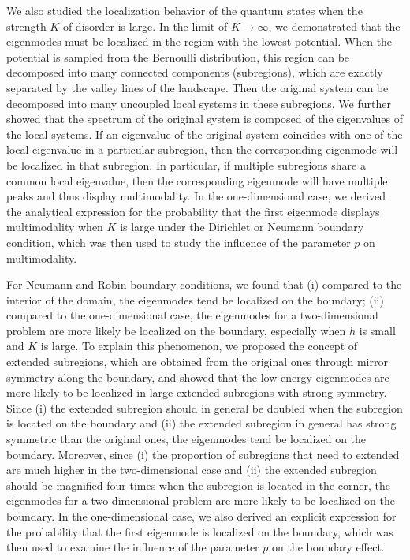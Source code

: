 \documentclass[a4paper,11pt]{article}
\begin{document}
We also studied the localization behavior of the quantum states when the strength $K$ of disorder is large. In the limit of $K\rightarrow\infty$, we demonstrated that the eigenmodes must be localized in the region with the lowest potential. When the potential is sampled from the Bernoulli distribution, this region can be decomposed into many connected components (subregions), which are exactly separated by the valley lines of the landscape. Then the original system can be decomposed into many uncoupled local systems in these subregions. We further showed that the spectrum of the original system is composed of the eigenvalues of the local systems. If an eigenvalue of the original system coincides with one of the local eigenvalue in a particular subregion, then the corresponding eigenmode will be localized in that subregion. In particular, if multiple subregions share a common local eigenvalue, then the corresponding eigenmode will have multiple peaks and thus display multimodality. In the one-dimensional case, we derived the analytical expression for the probability that the first eigenmode displays multimodality when $K$ is large under the Dirichlet or Neumann boundary condition, which was then used to study the influence of the parameter $p$ on multimodality.

For Neumann and Robin boundary conditions, we found that (i) compared to the interior of the domain, the eigenmodes tend be localized on the boundary; (ii) compared to the one-dimensional case, the eigenmodes for a two-dimensional problem are more likely be localized on the boundary, especially when $h$ is small and $K$ is large. To explain this phenomenon, we proposed the concept of extended subregions, which are obtained from the original ones through mirror symmetry along the boundary, and showed that the low energy eigenmodes are more likely to be localized in large extended subregions with strong symmetry. Since (i) the extended subregion should in general be doubled when the subregion is located on the boundary and (ii) the extended subregion in general has strong symmetric than the original ones, the eigenmodes tend be localized on the boundary. Moreover, since (i) the proportion of subregions that need to extended are much higher in the two-dimensional case and (ii) the extended subregion should be magnified four times when the subregion is located in the corner, the eigenmodes for a two-dimensional problem are more likely to be localized on the boundary. In the one-dimensional case, we also derived an explicit expression for the probability that the first eigenmode is localized on the boundary, which was then used to examine the influence of the parameter $p$ on the boundary effect.
\end{document}

